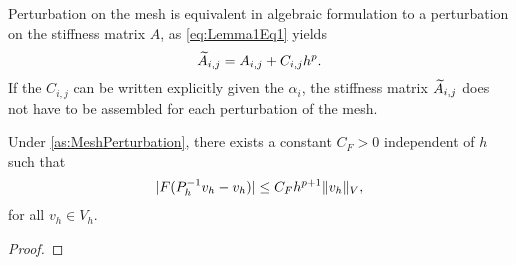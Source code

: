 \documentclass[10pt]{article}
\begin{document}
\begin{remark} Perturbation on the mesh is equivalent in algebraic formulation to a perturbation on the stiffness matrix $A$, as \eqref{eq:Lemma1Eq1} yields
	\begin{equation}
		\widetilde A_{i,j} = A_{i,j} + C_{i,j} h^p.
	\end{equation}
	If the $C_{i,j}$ can be written explicitly given the $\alpha_i$, the stiffness matrix $\widetilde A_{i,j}$ does not have to be assembled for each perturbation of the mesh.
\end{remark}

\begin{lemma}\label{lem:F} Under \cref{as:MeshPerturbation}, there exists a constant $C_F > 0$ independent of $h$ such that
	\begin{equation}
	\lvert F(P_h^{-1} v_h - v_h)\rvert \leq C_F h^{p+1} \lVert v_h\rVert_V,
	\end{equation}
	for all $v_h \in V_h$.
\end{lemma}
\begin{proof} \todo
\end{proof}
\end{document}
